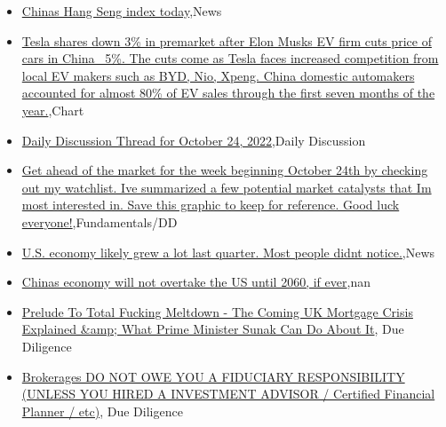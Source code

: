 \documentclass{article}%
\begin{document}
%
\begin{itemize}%
\item%
\href{https://reddit.com/r/wallstreetbets/comments/yc7txv/chinas\_hang\_seng\_index\_today/}{Chinas Hang Seng index today},News%
\item%
\href{https://reddit.com/r/wallstreetbets/comments/yc7nmq/tesla\_shares\_down\_3\_in\_premarket\_after\_elon\_musks/}{Tesla shares down 3\% in premarket after Elon Musks EV firm cuts price of cars in China ~5\%. The cuts come as Tesla faces increased competition from local EV makers such as BYD, Nio, Xpeng. China domestic automakers accounted for almost 80\% of EV sales through the first seven months of the year.},Chart%
\item%
\href{https://reddit.com/r/wallstreetbets/comments/yc784a/daily\_discussion\_thread\_for\_october\_24\_2022/}{Daily Discussion Thread for October 24, 2022},Daily Discussion%
\item%
\href{https://reddit.com/r/StockMarket/comments/yc8195/get\_ahead\_of\_the\_market\_for\_the\_week\_beginning/}{Get ahead of the market for the week beginning October 24th by checking out my watchlist. Ive summarized a few potential market catalysts that Im most interested in. Save this graphic to keep for reference. Good luck everyone!},Fundamentals/DD%
\item%
\href{https://reddit.com/r/Economics/comments/yc43xl/us\_economy\_likely\_grew\_a\_lot\_last\_quarter\_most/}{U.S. economy likely grew a lot last quarter. Most people didnt notice.},News%
\item%
\href{https://reddit.com/r/Economics/comments/yc2fmp/chinas\_economy\_will\_not\_overtake\_the\_us\_until/}{Chinas economy will not overtake the US until 2060, if ever},nan%
\item%
\href{https://reddit.com/r/Superstonk/comments/ycb84d/prelude\_to\_total\_fucking\_meltdown\_the\_coming\_uk/}{Prelude To Total Fucking Meltdown - The Coming UK Mortgage Crisis Explained \&amp; What Prime Minister Sunak Can Do About It}, Due Diligence%
\item%
\href{https://reddit.com/r/Superstonk/comments/yc9gcx/brokerages\_do\_not\_owe\_you\_a\_fiduciary/}{Brokerages DO NOT OWE YOU A FIDUCIARY RESPONSIBILITY (UNLESS YOU HIRED A INVESTMENT ADVISOR / Certified Financial Planner / etc)}, Due Diligence%
\end{itemize}%
\end{document}

